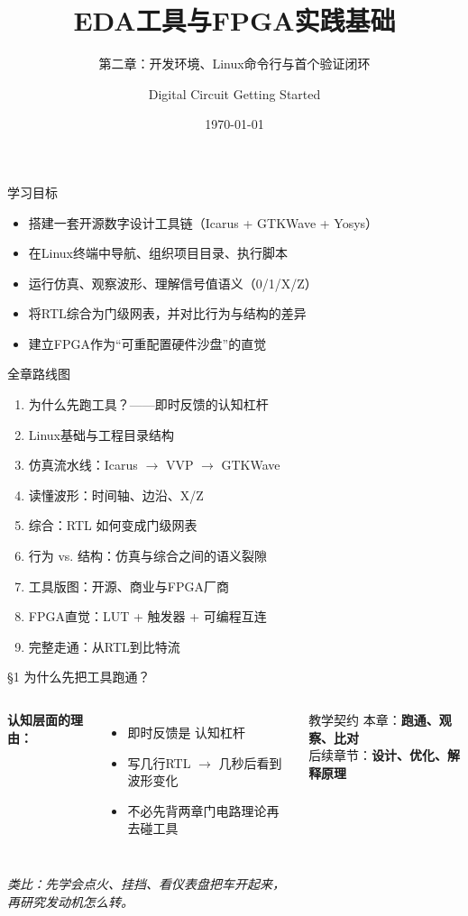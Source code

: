 \documentclass[aspectratio=169]{beamer}
\title{EDA工具与FPGA实践基础}
\subtitle{第二章：开发环境、Linux命令行与首个验证闭环}
\author{Digital Circuit Getting Started}
\date{\today}
\begin{document}
\begin{frame}
  \titlepage
\end{frame}

\begin{frame}{学习目标}
\begin{itemize}
  \item 搭建一套开源数字设计工具链（Icarus + GTKWave + Yosys）
  \item 在Linux终端中导航、组织项目目录、执行脚本
  \item 运行仿真、观察波形、理解信号值语义（0/1/X/Z）
  \item 将RTL综合为门级网表，并对比行为与结构的差异
  \item 建立FPGA作为``可重配置硬件沙盘''的直觉
\end{itemize}
\end{frame}

\begin{frame}{全章路线图}
\begin{enumerate}
  \item 为什么先跑工具？——即时反馈的认知杠杆
  \item Linux基础与工程目录结构
  \item 仿真流水线：Icarus $\rightarrow$ VVP $\rightarrow$ GTKWave
  \item 读懂波形：时间轴、边沿、X/Z
  \item 综合：RTL 如何变成门级网表
  \item 行为 vs. 结构：仿真与综合之间的语义裂隙
  \item 工具版图：开源、商业与FPGA厂商
  \item FPGA直觉：LUT + 触发器 + 可编程互连
  \item 完整走通：从RTL到比特流
\end{enumerate}
\end{frame}

\begin{frame}{\S1 为什么先把工具跑通？}
\begin{columns}
\textbf{认知层面的理由：}
\begin{itemize}
  \item 即时反馈是 \alert{认知杠杆}
  \item 写几行RTL $\rightarrow$ 几秒后看到波形变化
  \item 不必先背两章门电路理论再去碰工具
\end{itemize}
\begin{block}{教学契约}
\small
本章：\textbf{跑通、观察、比对}\\
后续章节：\textbf{设计、优化、解释原理}
\end{block}
\end{columns}
\vspace{0.5em}
\centering
\textit{类比：先学会点火、挂挡、看仪表盘把车开起来，\\再研究发动机怎么转。}
\end{frame}
\end{document}
